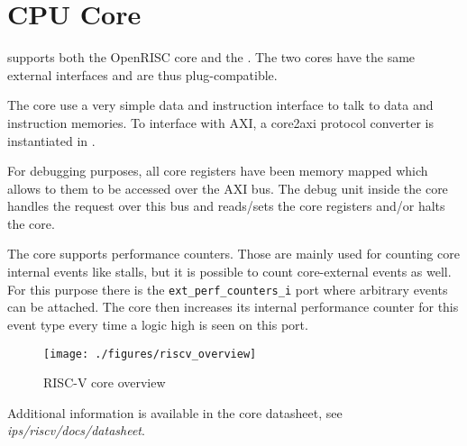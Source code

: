 \chapter{CPU Core}

\pulpino supports both the OpenRISC \orion core and the \riscv \rvcore. The two
cores have the same external interfaces and are thus plug-compatible.

The core use a very simple data and instruction interface to talk to data and
instruction memories. To interface with AXI, a core2axi protocol converter is
instantiated in \pulpino.

For debugging purposes, all core registers have been memory mapped which allows
to them to be accessed over the AXI bus. The debug unit inside the core handles
the request over this bus and reads/sets the core registers and/or halts the core.

The core supports performance counters. Those are mainly used for counting core
internal events like stalls, but it is possible to count core-external events
as well. For this purpose there is the \texttt{ext\_perf\_counters\_i} port where
arbitrary events can be attached. The core then increases its internal
performance counter for this event type every time a logic high is seen on this
port.

\begin{figure}[ht]
  \centering
  \texttt{[image: ./figures/riscv\_overview]}
  \caption{RISC-V core overview}
  \label{fig1}
\end{figure}


Additional information is available in the core datasheet, see
\textit{ips/riscv/docs/datasheet}.
